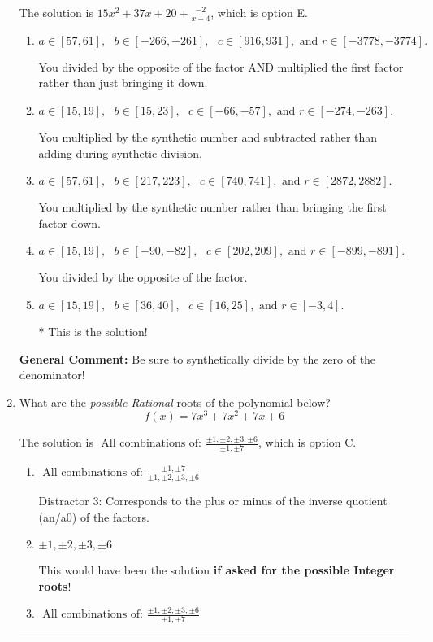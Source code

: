 \documentclass{extbook}[14pt]
\newcommand{\litem}[1]{\item #1

\rule{\textwidth}{0.4pt}}
\begin{document}
\begin{enumerate}
{The solution is \( 15x^{2} +37 x + 20 + \frac{-2}{x -4} \), which is option E.\begin{enumerate}[label=\Alph*.]
\item \( a \in [57, 61], \text{   } b \in [-266, -261], \text{   } c \in [916, 931], \text{   and   } r \in [-3778, -3774]. \)

 You divided by the opposite of the factor AND multiplied the first factor rather than just bringing it down.
\item \( a \in [15, 19], \text{   } b \in [15, 23], \text{   } c \in [-66, -57], \text{   and   } r \in [-274, -263]. \)

 You multiplied by the synthetic number and subtracted rather than adding during synthetic division.
\item \( a \in [57, 61], \text{   } b \in [217, 223], \text{   } c \in [740, 741], \text{   and   } r \in [2872, 2882]. \)

 You multiplied by the synthetic number rather than bringing the first factor down.
\item \( a \in [15, 19], \text{   } b \in [-90, -82], \text{   } c \in [202, 209], \text{   and   } r \in [-899, -891]. \)

 You divided by the opposite of the factor.
\item \( a \in [15, 19], \text{   } b \in [36, 40], \text{   } c \in [16, 25], \text{   and   } r \in [-3, 4]. \)

* This is the solution!
\end{enumerate}

\textbf{General Comment:} Be sure to synthetically divide by the zero of the denominator!
}
\litem{
What are the \textit{possible Rational} roots of the polynomial below?
\[ f(x) = 7x^{3} +7 x^{2} +7 x + 6 \]

The solution is \( \text{ All combinations of: }\frac{\pm 1,\pm 2,\pm 3,\pm 6}{\pm 1,\pm 7} \), which is option C.\begin{enumerate}[label=\Alph*.]
\item \( \text{ All combinations of: }\frac{\pm 1,\pm 7}{\pm 1,\pm 2,\pm 3,\pm 6} \)

 Distractor 3: Corresponds to the plus or minus of the inverse quotient (an/a0) of the factors. 
\item \( \pm 1,\pm 2,\pm 3,\pm 6 \)

This would have been the solution \textbf{if asked for the possible Integer roots}!
\item \( \text{ All combinations of: }\frac{\pm 1,\pm 2,\pm 3,\pm 6}{\pm 1,\pm 7} \)


\end{enumerate}}
\end{enumerate}
\end{document}
